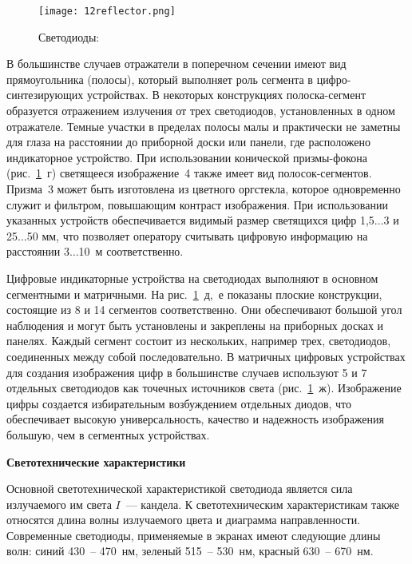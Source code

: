 \begin{figure}[h!]
	\caption{ Светодиоды:  }
	\texttt{[image: 12reflector.png]}
	\label{pic:12reflector}
\end{figure}

В большинстве случаев отражатели в поперечном сечении имеют вид прямоугольника (полосы), который выполняет роль сегмента в цифро-синтезирующих устройствах. В некоторых конструкциях полоска-сегмент образуется отражением излучения от трех светодиодов, установленных в одном отражателе. Темные участки в пределах полосы малы и практически не заметны для глаза на расстоянии до приборной доски или панели, где расположено индикаторное устройство. При использовании конической призмы-фокона (рис.~\ref{pic:12reflector}~г) светящееся изображение~4 также имеет вид полосок-сегментов. Призма~3 может быть изготовлена из цветного оргстекла, которое одновременно служит и фильтром, повышающим контраст изображения. При использовании указанных устройств обеспечивается видимый размер светящихся цифр 1,5$ \ldots $3 и 25$ \ldots $50 мм, что позволяет оператору считывать цифровую информацию на расстоянии 3$ \ldots $10~м соответственно.

Цифровые индикаторные устройства на светодиодах выполняют в основном сегментными и матричными. На рис.~\ref{pic:12reflector}~д,~е показаны плоские конструкции, состоящие из 8 и 14 сегментов соответственно. Они обеспечивают большой угол наблюдения и могут быть установлены и закреплены на приборных досках и панелях. Каждый сегмент состоит из нескольких, например трех, светодиодов, соединенных между собой последовательно. В матричных цифровых устройствах для создания изображения цифр в большинстве случаев используют 5 и 7 отдельных светодиодов как точечных источников света (рис.~\ref{pic:12reflector}~ж). Изображение цифры создается избирательным возбуждением отдельных диодов, что обеспечивает высокую универсальность, качество и надежность изображения большую, чем в сегментных устройствах.

\begin{flushleft}
\textbf{Светотехнические характеристики}
\end{flushleft}

Основной светотехнической характеристикой светодиода является сила излучаемого им света $ I $~--- кандела. К светотехническим характеристикам также относятся длина волны излучаемого цвета и диаграмма направленности. Современные светодиоды, применяемые в экранах имеют следующие длины волн: синий 430~-- 470~нм, зеленый 515~-- 530~нм, красный 630~-- 670~нм. 

